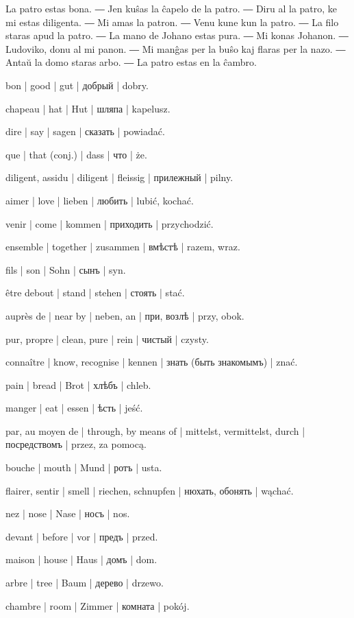 \begin{samepage}

La patro estas bona. ― Jen kuŝas la ĉapelo de la patro. ― Diru al la patro, ke mi estas diligenta. ― Mi amas la patron. ― Venu kune kun la patro. ― La filo staras apud la patro. ― La mano de Johano estas pura. ― Mi konas Johanon. ― Ludoviko, donu al mi panon. ― Mi manĝas per la buŝo kaj flaras per la nazo. ― Antaŭ la domo staras arbo. ― La patro estas en la ĉambro.
\end{samepage}

\begin{ekzvocab}{1em}
 bon | good | gut | добрый | dobry.

 chapeau | hat | Hut | шляпа | kapelusz.

 dire | say | sagen | сказать | powiadać.

 que | that (conj.) | dass | что | że.

 diligent, assidu | diligent | fleissig | прилежный | pilny.

 aimer | love | lieben | любить | lubić, kochać.

 venir | come | kommen | приходить | przychodzić.

 ensemble | together | zusammen | вмѣстѣ | razem, wraz.

 fils | son | Sohn | сынъ | syn.

 être debout | stand | stehen | стоять | stać.

 auprès de | near by | neben, an | при, возлѣ | przy, obok.

 pur, propre | clean, pure | rein | чистый | czysty.

 connaître | know, recognise | kennen | знать (быть знакомымъ) | znać.

 pain | bread | Brot | хлѣбъ | chleb.

 manger | eat | essen | ѣсть | jeść.

 par, au moyen de | through, by means of | mittelst, vermittelst, durch | посредствомъ | przez, za pomocą.

 bouche | mouth | Mund | ротъ | usta.

 flairer, sentir | smell | riechen, schnupfen | нюхать, обонять | wąchać.

 nez | nose | Nase | носъ | nos.

 devant | before | vor | предъ | przed.

 maison | house | Haus | домъ | dom.

 arbre | tree | Baum | дерево | drzewo.

 chambre | room | Zimmer | комната | pokój.

\end{ekzvocab}


